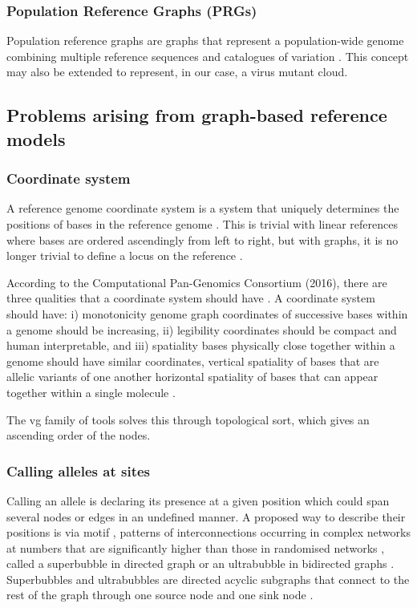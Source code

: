 \documentclass[10pt, a4paper]{article}
\begin{document}
\subsubsection{Population Reference Graphs (PRGs)}
\label{sec:org1dc4ecb}
Population reference graphs are graphs that represent a population-wide genome
combining multiple reference sequences and catalogues of variation
\cite{diltheyImprovedGenomeInference2015,liDesignConstructionReference2020}. 
This concept may also be extended to represent, in our case, a virus mutant
cloud.

\subsection{Problems arising from graph-based reference models}
\label{sec:org73804dc}
\subsubsection{Coordinate system}
\label{sec:orgbed8376}
A reference genome coordinate system is a system that uniquely determines the
positions of bases in the reference genome 
\cite{randCoordinatesIntervalsGraphbased2017}. 
This is trivial with linear references where bases are ordered ascendingly from 
left to right, but with graphs, it is no longer trivial to define a locus on 
the reference \cite{patenGenomeGraphsEvolution2017}. 

According to the Computational Pan-Genomics Consortium (2016), there are three
qualities that a coordinate system should have 
\cite{patenGenomeGraphsEvolution2017,randCoordinatesIntervalsGraphbased2017}. 
A coordinate system should have: i) monotonicity genome graph coordinates of
successive bases within a genome should be increasing, ii) legibility
coordinates should be compact and human interpretable, and iii) spatiality
bases physically close together within a genome should have similar coordinates,
vertical spatiality of bases that are allelic variants of one another 
\cite{randCoordinatesIntervalsGraphbased2017} horizontal spatiality of bases that can appear together 
within a single molecule \cite{randCoordinatesIntervalsGraphbased2017}. 

The vg family of tools solves this through topological sort, which gives an 
ascending order of the nodes.

\subsubsection{Calling alleles at sites}
\label{sec:org9291514}
Calling an allele is declaring its presence at a given position which could span
several nodes or edges in an undefined manner. 
A proposed way to describe their positions is via motif
\cite{patenGenomeGraphsEvolution2017}, patterns of interconnections occurring in
complex networks at numbers that are significantly higher than those in
randomised networks \cite{miloNetworkMotifsSimple2002}, called a superbubble in directed graph
or an ultrabubble in bidirected graphs \cite{patenGenomeGraphsEvolution2017}.
Superbubbles and ultrabubbles are directed acyclic subgraphs that connect to the
rest of the graph through one source node and one sink node
\cite{patenGenomeGraphsEvolution2017}.
\end{document}
